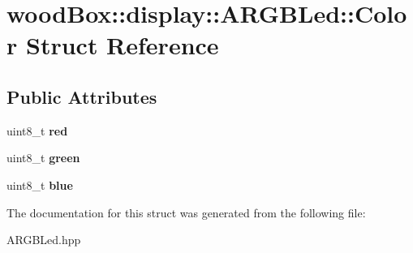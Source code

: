 \hypertarget{structwood_box_1_1display_1_1_a_r_g_b_led_1_1_color}{}\section{wood\+Box\+:\+:display\+:\+:A\+R\+G\+B\+Led\+:\+:Color Struct Reference}
\label{structwood_box_1_1display_1_1_a_r_g_b_led_1_1_color}
\subsection*{Public Attributes}
\begin{DoxyCompactItemize}
\item 
\mbox{\label{structwood_box_1_1display_1_1_a_r_g_b_led_1_1_color_a72c1bf60c1ed082f9abaf44fb0b585cd}} 
uint8\+\_\+t {\bfseries red}
\item 
\mbox{\label{structwood_box_1_1display_1_1_a_r_g_b_led_1_1_color_a282da85a3c4f9795186f0bb2c4ca2073}} 
uint8\+\_\+t {\bfseries green}
\item 
\mbox{\label{structwood_box_1_1display_1_1_a_r_g_b_led_1_1_color_a61eeae5c5896ee5ea3db56d5c124ee1a}} 
uint8\+\_\+t {\bfseries blue}
\end{DoxyCompactItemize}


The documentation for this struct was generated from the following file\+:\begin{DoxyCompactItemize}
\item 
A\+R\+G\+B\+Led.\+hpp\end{DoxyCompactItemize}
